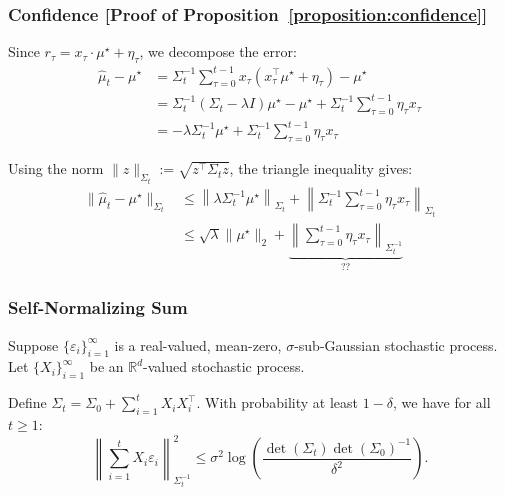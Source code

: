 \documentclass[aspectratio=169]{beamer}
\begin{document}
\begin{frame}\frametitle{Confidence [Proof of Proposition~\ref{proposition:confidence}]}
\small

\vspace*{-0.1cm}
Since $r_\tau=x_\tau \cdot\mu^\star +\eta_\tau $, we decompose the error:
\vspace{-0.2cm}
\begin{align*}
\widehat \mu_t - \mu^\star 
&= \Sigma_t^{-1}\sum_{\tau = 0}^{t-1} x_\tau (x_\tau^\top \mu^\star +\eta_\tau) - \mu^\star \\
&= \Sigma_t^{-1}\left( \Sigma_t - \lambda I \right) \mu^\star - \mu^\star +\Sigma_t^{-1}\sum_{\tau = 0}^{t-1} \eta_\tau x_\tau\\
&= -\lambda \Sigma_t^{-1}\mu^\star +\Sigma_t^{-1}\sum_{\tau = 0}^{t-1} \eta_\tau x_\tau
\end{align*}

\pause
\vspace*{-0.2cm}
Using the norm $\|z\|_{\Sigma_t} := \sqrt{z^\top \Sigma_t z}$, the triangle inequality gives:
\vspace{-0.2cm}
\begin{align*}
\|\widehat \mu_t - \mu^\star\|_{\Sigma_t} 
&\leq \left\| \lambda \Sigma_t^{-1}\mu^\star \right\|_{\Sigma_t} + \left\| \Sigma_t^{-1}\sum_{\tau = 0}^{t-1} \eta_\tau x_\tau \right\|_{\Sigma_t} \\
&\leq \sqrt{\lambda}\|\mu^\star\|_2 + \underbrace{\left\| \sum_{\tau = 0}^{t-1} \eta_\tau x_\tau \right\|_{\Sigma_t^{-1}}}_{\text{??}}
\end{align*} 

\end{frame}

\begin{frame}\frametitle{Self-Normalizing Sum}

\begin{lemma}
Suppose $\{\varepsilon_i\}_{i=1}^{\infty}$ is a real-valued, mean-zero, $\sigma$-sub-Gaussian stochastic process. Let $\{X_i\}_{i=1}^{\infty}$ be an $\mathbb{R}^d$-valued stochastic process. 

\vspace{0.2cm}
Define $\Sigma_t = \Sigma_0 + \sum_{i=1}^{t} X_i X_i^{\top}$. With probability at least $1-\delta$, we have for all $t\geq 1$: 
\[
\left\| \sum_{i=1}^{t} X_i \varepsilon_i \right\|^2_{\Sigma_t^{-1}} \leq \sigma^2 \log\left(\frac{ \det( \Sigma_t) \det(\Sigma_0)^{-1} }{ \delta^2 }\right).
\]
\end{lemma}

\end{frame}
\end{document}
